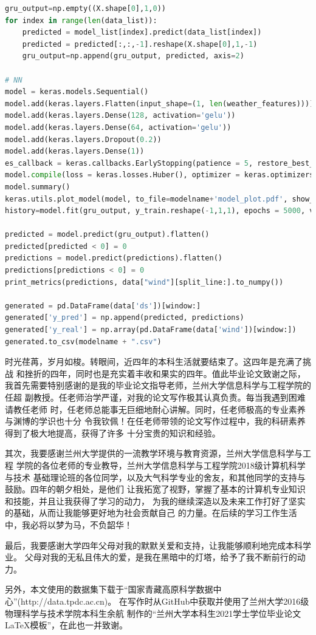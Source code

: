 \documentclass[AutoFakeBold]{LZUThesis}
\begin{document}
\begin{lstlisting}[language = python]
gru_output=np.empty((X.shape[0],1,0))
for index in range(len(data_list)):
    predicted = model_list[index].predict(data_list[index])
    predicted = predicted[:,:,-1].reshape(X.shape[0],1,-1)
    gru_output=np.append(gru_output, predicted, axis=2)

# NN
model = keras.models.Sequential()
model.add(keras.layers.Flatten(input_shape=(1, len(weather_features))))
model.add(keras.layers.Dense(128, activation='gelu'))
model.add(keras.layers.Dense(64, activation='gelu'))
model.add(keras.layers.Dropout(0.2))
model.add(keras.layers.Dense(1))
es_callback = keras.callbacks.EarlyStopping(patience = 5, restore_best_weights = True, monitor="loss")
model.compile(loss = keras.losses.Huber(), optimizer = keras.optimizers.Nadam(0.001))
model.summary()
keras.utils.plot_model(model, to_file=modelname+'model_plot.pdf', show_shapes=True, show_layer_names=True)
history=model.fit(gru_output, y_train.reshape(-1,1,1), epochs = 5000, verbose = 1, shuffle = True, callbacks = [es_callback])

predicted = model.predict(gru_output).flatten()
predicted[predicted < 0] = 0
predictions = model.predict(predictions).flatten()
predictions[predictions < 0] = 0
print_metrics(predictions, data["wind"][split_line:].to_numpy())

generated = pd.DataFrame(data['ds'])[window:]
generated['y_pred'] = np.append(predicted, predictions)
generated['y_real'] = np.array(pd.DataFrame(data['wind'])[window:])
generated.to_csv(modelname + ".csv")
\end{lstlisting}

\Thanks

时光荏苒，岁月如梭。转眼间，近四年的本科生活就要结束了。这四年是充满了挑战
和挫折的四年，同时也是充实着丰收和果实的四年。值此毕业论文致谢之际，
我首先需要特别感谢的是我的毕业论文指导老师，兰州大学信息科学与工程学院的任超
副教授。任老师治学严谨，对我的论文写作极其认真负责。每当我遇到困难请教任老师
时，任老师总能事无巨细地耐心讲解。同时，任老师极高的专业素养与渊博的学识也十分
令我钦佩！在任老师带领的论文写作过程中，我的科研素养得到了极大地提高，获得了许多
十分宝贵的知识和经验。

其次，我要感谢兰州大学提供的一流教学环境与教育资源，兰州大学信息科学与工程
学院的各位老师的专业教导，兰州大学信息科学与工程学院2018级计算机科学与技术
基础理论班的各位同学，以及大气科学专业的舍友，和其他同学的支持与鼓励。四年的朝夕相处，是他们
让我拓宽了视野，掌握了基本的计算机专业知识和技能，并且让我获得了学习的动力，
为我的继续深造以及未来工作打好了坚实的基础，从而让我能够更好地为社会贡献自己
的力量。在后续的学习工作生活中，我必将以梦为马，不负韶华！

最后，我要感谢大学四年父母对我的默默关爱和支持，让我能够顺利地完成本科学业。
父母对我的无私且伟大的爱，是我在黑暗中的灯塔，给予了我不断前行的动力。

另外，本文使用的数据集下载于“国家青藏高原科学数据中心”(http://data.tpdc.ac.cn)。
在写作时从GitHub中获取并使用了兰州大学2016级物理科学与技术学院本科生余航
制作的“兰州大学本科生2021学士学位毕业论文LaTeX模板”，在此也一并致谢。

\rightline{}

\end{document}
